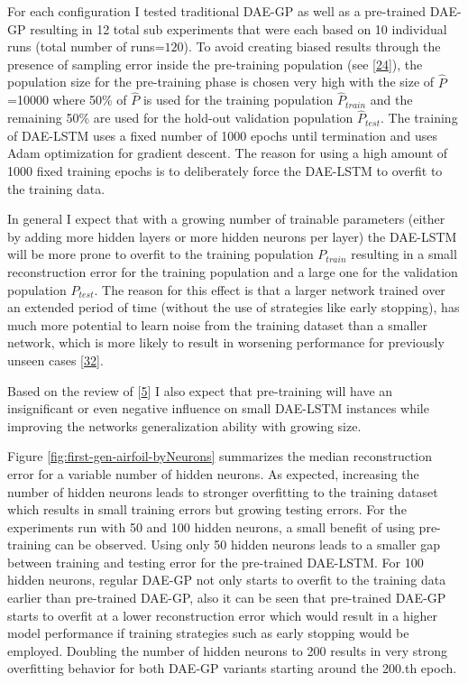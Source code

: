 \documentclass[
  11pt,
]{article}
\begin{document}
For each configuration I tested traditional DAE-GP as well as a pre-trained DAE-GP resulting in 12 total sub experiments that were each based on 10 individual runs (total number of runs=\(120\)).
To avoid creating biased results through the presence of sampling error inside the pre-training population (see {[}\protect\hyperlink{ref-sampling_err_gp}{24}{]}), the population size for the pre-training phase is chosen very high with the size of \(\hat{P}\) =10000 where 50\% of \(\hat{P}\) is used for the training population \(\hat{P}_{train}\) and the remaining 50\% are used for the hold-out validation population \(\hat{P}_{test}\).
The training of DAE-LSTM uses a fixed number of 1000 epochs until termination and uses Adam optimization for gradient descent.
The reason for using a high amount of 1000 fixed training epochs is to deliberately force the DAE-LSTM to overfit to the training data.

In general I expect that with a growing number of trainable parameters (either by adding more hidden layers or more hidden neurons per layer) the DAE-LSTM will be more prone to overfit to the training population \(P_{train}\) resulting in a small reconstruction error for the training population and a large one for the validation population \(P_{test}\).
The reason for this effect is that a larger network trained over an extended period of time (without the use of strategies like early stopping), has much more potential to learn noise from the training dataset than a smaller network, which is more likely to result in worsening performance for previously unseen cases {[}\protect\hyperlink{ref-weigend1994overfitting}{32}{]}.

Based on the review of {[}\protect\hyperlink{ref-pmlr-v5-erhan09a}{5}{]} I also expect that pre-training will have an insignificant or even negative influence on small DAE-LSTM instances while improving the networks generalization ability with growing size.

Figure \ref{fig:first-gen-airfoil-byNeurons} summarizes the median reconstruction error for a variable number of hidden neurons.
As expected, increasing the number of hidden neurons leads to stronger overfitting to the training dataset which results in small training errors but growing testing errors.
For the experiments run with 50 and 100 hidden neurons, a small benefit of using pre-training can be observed.
Using only 50 hidden neurons leads to a smaller gap between training and testing error for the pre-trained DAE-LSTM.
For 100 hidden neurons, regular DAE-GP not only starts to overfit to the training data earlier than pre-trained DAE-GP, also it can be seen that pre-trained DAE-GP starts to overfit at a lower reconstruction error which would result in a higher model performance if training strategies such as early stopping would be employed.
Doubling the number of hidden neurons to 200 results in very strong overfitting behavior for both DAE-GP variants starting around the 200.th epoch.
\end{document}
